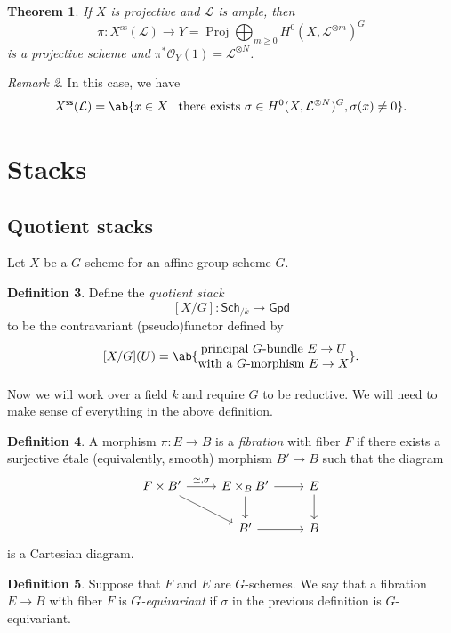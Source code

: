 \documentclass{amsart}
\newtheorem{thm}{Theorem}[section]
\theoremstyle{definition}
\newtheorem{defn}[thm]{Definition}
\theoremstyle{remark}
\newtheorem{rmk}[thm]{Remark}
\theoremstyle{plain}
\theoremstyle{definition}
\theoremstyle{remark}
\newcommand{\mc}[1]{\mathcal{#1}}
\newcommand{\on}[1]{\operatorname{#1}}
\newcommand{\ms}[1]{\mathsf{#1}}
\newcommand{\1}{\mathbf{1}}
\newcommand{\2}{\mathbf{2}}
\newcommand{\3}{\mathbf{3}}
\DeclareMathOperator{\Proj}{Proj}
\begin{document}
\begin{thm}
    If \(X\) is projective and \(\mc{L}\) is ample, then
    \[ \pi\colon X^{\on{ss}}(\mc{L}) \to Y = \Proj \bigoplus_{m \geq 0} H^0(X, \mc{L}^{\otimes m})^G \]
    is a projective scheme and \(\pi^* \mc{O}_Y(1) = \mc{L}^{\otimes N}\). 
\end{thm}

\begin{rmk}
    In this case, we have
    \[ X^{\ms{ss}}(\mc{L}) = \ab\{ x \in X \mid \text{there exists } \sigma \in H^0(X, \mc{L}^{\otimes N})^G, \sigma(x) \neq 0 \}. \]
\end{rmk}

\section{Stacks}%
\label{sec:Stacks}

\subsection{Quotient stacks}%
\label{sub:Quotient stacks}

Let \(X\) be a \(G\)-scheme for an affine group scheme \(G\). 
\begin{defn}
    Define the \textit{quotient stack}
    \[ [X/G] \colon \ms{Sch}_{/k} \to \ms{Gpd} \]
    to be the contravariant (pseudo)functor defined by
    \[ [X/G](U) = \ab\{ \Centerstack{{principal \(G\)-bundle \(E \to U\)} {with a \(G\)-morphism \(E \to X\)}} \}. \]
\end{defn}

Now we will work over a field \(k\) and require \(G\) to be reductive. We will need to make sense of everything in the above definition.

\begin{defn}
    A morphism \(\pi \colon E \to B\) is a \textit{fibration} with fiber \(F\) if there exists a surjective \'etale (equivalently, smooth) morphism \(B' \to B\) such that the diagram
    \begin{equation*}
    \begin{tikzcd}
        F \times B' \ar{r}{\simeq, \sigma} \ar{dr} & E \times_B B' \ar{r} \ar{d} & E \ar{d} \\
        & B' \ar{r} & B
    \end{tikzcd}
    \end{equation*}
    is a Cartesian diagram.
\end{defn}

\begin{defn}
    Suppose that \(F\) and \(E\) are \(G\)-schemes. We say that a fibration \(E \to B\) with fiber \(F\) is \textit{\(G\)-equivariant} if \(\sigma\) in the previous definition is \(G\)-equivariant.
\end{defn}
\end{document}
